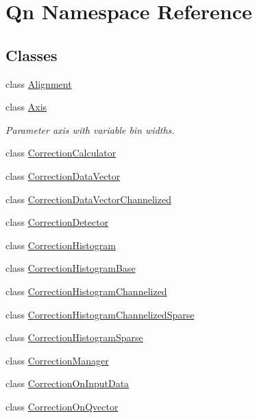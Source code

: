 \hypertarget{namespaceQn}{}\section{Qn Namespace Reference}
\label{namespaceQn}
\subsection*{Classes}
\begin{DoxyCompactItemize}
\item 
class \mbox{\hyperlink{classQn_1_1Alignment}{Alignment}}
\item 
class \mbox{\hyperlink{classQn_1_1Axis}{Axis}}
\begin{DoxyCompactList}\small\item\em Parameter axis with variable bin widths. \end{DoxyCompactList}\item 
class \mbox{\hyperlink{classQn_1_1CorrectionCalculator}{Correction\+Calculator}}
\item 
class \mbox{\hyperlink{classQn_1_1CorrectionDataVector}{Correction\+Data\+Vector}}
\item 
class \mbox{\hyperlink{classQn_1_1CorrectionDataVectorChannelized}{Correction\+Data\+Vector\+Channelized}}
\item 
class \mbox{\hyperlink{classQn_1_1CorrectionDetector}{Correction\+Detector}}
\item 
class \mbox{\hyperlink{classQn_1_1CorrectionHistogram}{Correction\+Histogram}}
\item 
class \mbox{\hyperlink{classQn_1_1CorrectionHistogramBase}{Correction\+Histogram\+Base}}
\item 
class \mbox{\hyperlink{classQn_1_1CorrectionHistogramChannelized}{Correction\+Histogram\+Channelized}}
\item 
class \mbox{\hyperlink{classQn_1_1CorrectionHistogramChannelizedSparse}{Correction\+Histogram\+Channelized\+Sparse}}
\item 
class \mbox{\hyperlink{classQn_1_1CorrectionHistogramSparse}{Correction\+Histogram\+Sparse}}
\item 
class \mbox{\hyperlink{classQn_1_1CorrectionManager}{Correction\+Manager}}
\item 
class \mbox{\hyperlink{classQn_1_1CorrectionOnInputData}{Correction\+On\+Input\+Data}}
\item 
class \mbox{\hyperlink{classQn_1_1CorrectionOnQvector}{Correction\+On\+Qvector}}
\item 

\end{DoxyCompactItemize}
